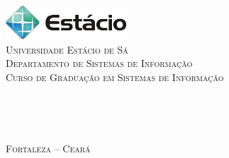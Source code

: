 \thispagestyle{empty}

\begin{center}
    \includegraphics[width=4.5cm]{Figuras/universidade-estacio-de-sa} \\%
    \textsc{
    Universidade Est{\'a}cio de S{\'a}  \\%
    Departamento de Sistemas de Informa\c{c}{\~a}o \\%
    Curso de Gradua\c{c}{\~a}o em Sistemas de Informa\c{c}{\~a}o\\
    }

    \null\vfill%
    \vspace{.5cm}%
        {\LARGE         \textbf{\titulo}\\}

    \null\vfill%
    \vspace{.5cm}%

    {\normalsize    \textbf{\nomeautor}} \\%

    \null\vfill%
    \vspace{.25cm}%

    {\normalsize    \textsc{Fortaleza -- Cear\'{a} \\%
                            \mesano}}
\end{center}

